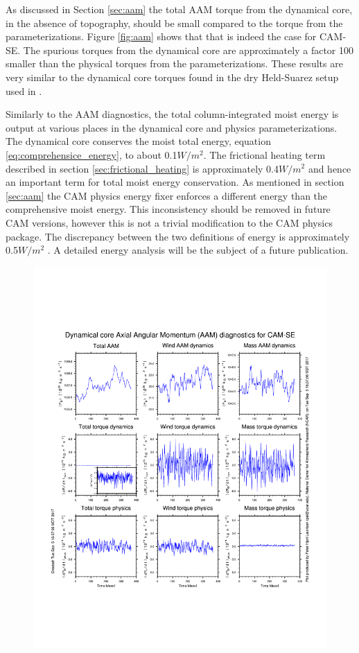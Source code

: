 \documentclass{agujournal}
\begin{document}
{As discussed in Section \ref{sec:aam} the total AAM torque from the dynamical core, in the absence of topography, should be small compared to the torque from the parameterizations. Figure \ref{fig:aam} shows that that is indeed the case for CAM-SE. The spurious torques from the dynamical core are approximately a factor 100 smaller than the physical torques from the parameterizations. These results are very similar to the dynamical core torques found in the dry Held-Suarez setup used in \citet{LBDL2014JAMES}.

Similarly to the AAM diagnostics, the total column-integrated moist energy is output at various places in the dynamical core and physics parameterizations. The dynamical core conserves the moist total energy, equation \eqref{eq:comprehensice_energy}, to about 0.1$W/m^2$. The frictional heating term described in section \ref{sec:frictional_heating} is approximately 0.4$W/m^2$ and hence an important term for total moist energy conservation. As mentioned in section \ref{sec:aam} the CAM physics energy fixer enforces a different energy than the comprehensive moist energy. This inconsistency should be removed in future CAM versions, however this is not a trivial modification to the CAM physics package. The discrepancy between the two definitions of energy is approximately 0.5$W/m^2$ \citep[similar to what ][ found when just including the correct heat capacity for water vapor in the total energy equation]{T2011LNCSEb}. A detailed energy analysis will be the subject of a future publication.
%
\begin{figure}[h]
\centering
\includegraphics[width=30pc]{figs/aam.pdf}

\end{figure}}
\end{document}
